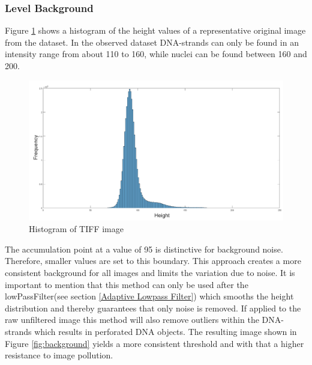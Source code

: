 \documentclass{article}
\begin{document}
\subsubsection{Level Background}

Figure \ref{fig:HistThresh} shows a histogram of the height values of a representative original image from the dataset.
In the observed dataset DNA-strands can only be found in an intensity range from about 110 to 160, while nuclei can be found between 160 and 200.


\begin{figure}[!htb]
	\includegraphics[width=1\linewidth]{histogramOriginal.png}
	\caption{Histogram of TIFF image}
	\label{fig:HistThresh}
\end{figure}
The accumulation point at a value of 95 is distinctive for background noise. 
Therefore, smaller values are set to this boundary.
This approach creates a more consistent background for all images and limits the variation due to noise.
It is important to mention that this method can only be used after the lowPassFilter(see section \ref{Adaptive Lowpass Filter}) which smooths the height distribution and thereby guarantees that only noise is removed. If applied to the raw unfiltered image this method will also remove outliers within the DNA-strands which results in perforated DNA objects.
The resulting image shown in Figure \ref{fig:background} yields a more consistent threshold and with that a higher resistance to image pollution.
\end{document}
